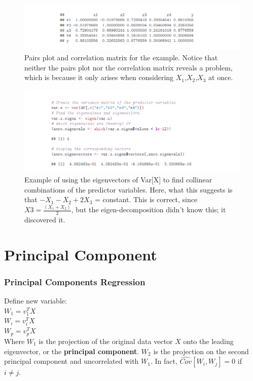 \documentclass{beamer}
\begin{document}
\begin{frame}
\begin{figure}[t]
\begin{center}
\includegraphics[scale=0.4]{corplot}
\end{center}
\caption{Pairs plot and correlation matrix for the example. Notice that neither the pairs plot nor the correlation matrix reveals a problem, which is because it only arises when considering $X_1$,$X_2$,$X_3$ at once.}
\end{figure}
\end{frame}

\begin{frame}
\begin{figure}[t]

\begin{center}
\includegraphics[scale=0.45]{eigenplot}
\end{center}
\caption{\tiny Example of using the eigenvectors of Var[X] to find collinear combinations of the predictor variables. Here, what this suggests is that $-X_1-X_2+2X_3$ = constant. This is correct, since $X3 =\frac{(X_1+X_2)}{2}$, but the eigen-decomposition didn't know this; it discovered it.}
\end{figure}
\end{frame}

\section{Principal Component}
\begin{frame}
\frametitle{Principal Components Regression}
Define new variable:\\
\hspace{1in} $W_1=v_1^{T}X$\\
\hspace{1in} $W_i=v_i^{T}X$\\
\hspace{1in} $W_p=v_p^{T}X$\\
Where $W_1$ is the projection of the original data vector $X$ onto the leading eigenvector, or the \textbf{principal component}. $W_2$ is the projection on the second principal component and uncorrelated with $W_1$. In fact, $\widehat{Cov}[W_i,W_j]=0$ if $i \neq j.$
\end{frame}
\end{document}
